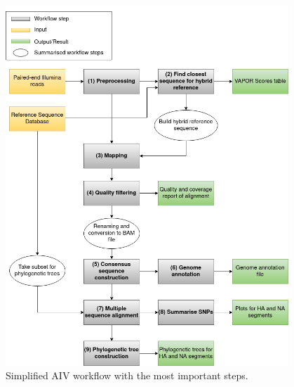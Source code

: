 \begin{figure}[ht!]
	\includegraphics[width=0.95\textwidth]{media/aiv.png}
	\caption{Simplified \ac{AIV} workflow with the most important steps.}
	\label{fig:3-aiv-wf}
\end{figure}

